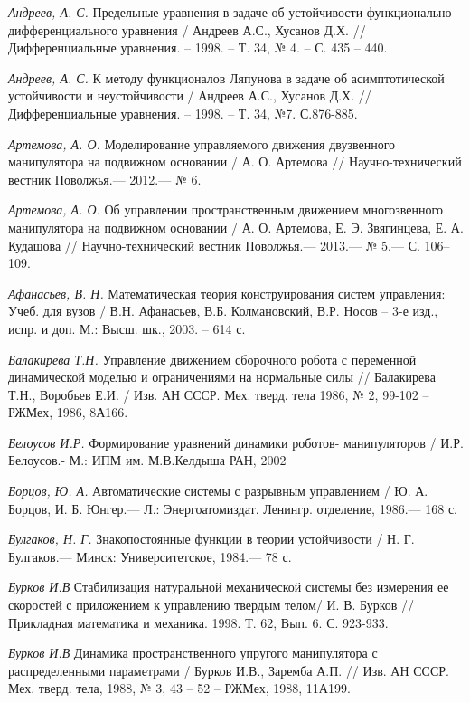 \begin{thebibliography}{10}
	{\it Андреев, А. С.} Предельные уравнения в задаче об устойчивости функционально-дифференциального уравнения / Андреев А.С., Хусанов Д.Х. // 		Дифференциальные уравнения. – 1998. – Т. 34, № 4. – С. 435 – 440.
	
	{\it Андреев, А. С.} К методу функционалов Ляпунова в задаче об
	асимптотической устойчивости и неустойчивости / Андреев А.С., Хусанов Д.Х. // Дифференциальные уравнения. – 1998. – Т. 34, №7. С.876-885.
	
	{\it Артемова, А. О.} Моделирование управляемого движения двузвенного манипулятора на подвижном основании /
	А. О. Артемова // Научно-технический вестник Поволжья.— 2012.— № 6.
	
	{\it Артемова, А. О.} Об управлении пространственным движением многозвенного манипулятора на подвижном основании /
	А. О. Артемова, Е. Э. Звягинцева, Е. А. Кудашова // Научно-технический вестник Поволжья.— 2013.— № 5.— С. 106–109.
	
	{\it Афанасьев, В. Н.} Математическая теория конструирования систем управления: Учеб. для вузов / В.Н. Афанасьев, В.Б. Колмановский, В.Р. Носов 	– 3-е изд., испр. и доп. М.: Высш. шк., 2003. – 614 с.

	{\it Балакирева Т.Н.} Управление движением сборочного робота с переменной динамической моделью и ограничениями на нормальные силы // Балакирева 	Т.Н., Воробьев Е.И. / Изв. АН СССР. Мех. тверд. тела 1986, № 2, 99-102 – РЖМех, 1986, 8А166.

	{\it Белоусов И.Р.} Формирование уравнений динамики роботов-  манипуляторов / И.Р. Белоусов.- М.: ИПМ им. М.В.Келдыша РАН, 2002
	
	{\it Борцов, Ю. А.} Автоматические системы с разрывным управлением / Ю. А. Борцов,
	И. Б. Юнгер.— Л.: Энергоатомиздат. Ленингр. отделение, 1986.— 168 с.
	
	{\it Булгаков, Н. Г.} Знакопостоянные функции в теории устойчивости /
	Н. Г. Булгаков.— Минск: Университетское, 1984.— 78 с.
	
	{\it Бурков И.В} Стабилизация натуральной механической системы без измерения ее скоростей с приложением к управлению твердым телом/ И. В. 		Бурков // Прикладная математика и механика. 1998. Т. 62, Вып. 6. С. 923-933.
	
	{\it Бурков И.В} Динамика пространственного упругого манипулятора с распределенными параметрами / Бурков И.В., Заремба А.П. // Изв. АН СССР. 		Мех. тверд. тела, 1988, № 3, 43 – 52 – РЖМех, 1988, 11А199.
	

\end{thebibliography}
